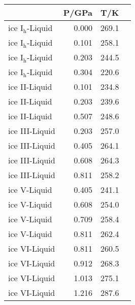 \begin{tabular}{lrrl}
\hline\hline
&P/GPa&T/K\\
\hline
ice I$_{\mathrm h}$-Liquid&0.000&269.1\\
ice I$_{\mathrm h}$-Liquid&0.101&258.1\\
ice I$_{\mathrm h}$-Liquid&0.203&244.5\\
ice I$_{\mathrm h}$-Liquid&0.304&220.6\\
\hline
ice II-Liquid&0.101&234.8\\
ice II-Liquid&0.203&239.6\\
ice II-Liquid&0.507&248.6\\
\hline
ice III-Liquid&0.203&257.0\\
ice III-Liquid&0.405&264.1\\
ice III-Liquid&0.608&264.3\\
ice III-Liquid&0.811&258.2\\
\hline
ice V-Liquid&0.405&241.1\\
ice V-Liquid&0.608&254.0\\
ice V-Liquid&0.709&258.4\\
ice V-Liquid&0.811&262.4\\
\hline
ice VI-Liquid&0.811&260.5\\
ice VI-Liquid&0.912&268.3\\
ice VI-Liquid&1.013&275.1\\
ice VI-Liquid&1.216&287.6\\
\hline
\hline\hline
\end{tabular}
